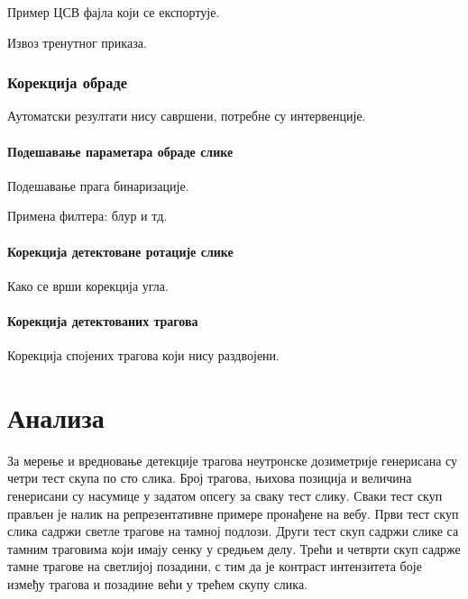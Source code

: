 \documentclass[12pt,a4paper,serbian,oneside]{book}
\begin{document}
Пример ЦСВ фајла који се експортује.

Извоз тренутног приказа.

\subsection{Корекција обраде}

Аутоматски резултати нису савршени, потребне су интервенције.

\subsubsection{Подешавање параметара обраде слике}

Подешавање прага бинаризације.

Примена филтера: блур и тд.

\subsubsection{Корекција детектоване ротације слике}

Како се врши корекција угла.

\subsubsection{Корекција детектованих трагова}

Корекција спојених трагова који нису раздвојени.

%
%
%

\chapter{Анализа}

За мерење и вредновање детекције трагова неутронске дозиметрије генерисана су четри тест скупа по сто слика. Број трагова, њихова позиција и величина генерисани су насумице у задатом опсегу за сваку тест слику. Сваки тест скуп прављен је налик на репрезентативне примере пронађене на вебу. Први тест скуп слика садржи светле трагове на тамној подлози. Други тест скуп садржи слике са тамним траговима који имају сенку у средњем делу. Трећи и четврти скуп садрже тамне трагове на светлијој позадини, с тим да је контраст интензитета боје између трагова и позадине већи у трећем скупу слика.
\end{document}
